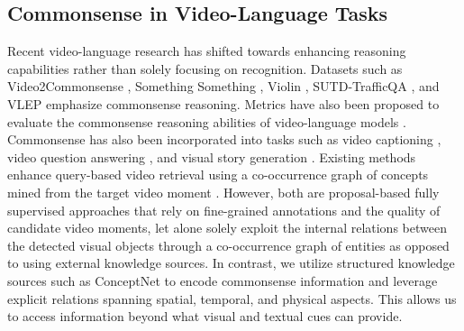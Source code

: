 \subsection{Commonsense in Video-Language Tasks}
Recent video-language research has shifted towards enhancing reasoning capabilities rather than solely focusing on recognition. Datasets such as Video2Commonsense \cite{fang_video2commonsense_2020}, Something Something \cite{goyal_something_2017}, Violin \cite{liu_violin_2020}, SUTD-TrafficQA \cite{peng_multi-modal_2021}, and VLEP \cite{lei_what_2020} emphasize commonsense reasoning. Metrics have also been proposed to evaluate the commonsense reasoning abilities of video-language models \cite{shin_cogme_2021,park_exposing_2022}. 
Commonsense has also been incorporated into tasks such as video captioning \cite{yu_hybrid_2021}, video question answering \cite{li_representation_2022}, and visual story generation \cite{maharana_integrating_2021}. 
Existing methods enhance query-based video retrieval using a co-occurrence graph of concepts mined from the target video moment \cite{wu_learning_2022,cao_visual_2022}. However, both are proposal-based fully supervised approaches that rely on fine-grained annotations and the quality of candidate video moments, let alone solely exploit the internal relations between the detected visual objects through a co-occurrence graph of entities as opposed to using external knowledge sources. In contrast, we utilize structured knowledge sources such as ConceptNet \cite{speer_conceptnet_2017} to encode commonsense information and leverage explicit relations spanning spatial, temporal, and physical aspects. This allows us to access information beyond what visual and textual cues can provide.
